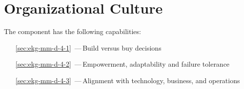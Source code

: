 \chapter{Organizational Culture}\label{ch:ekg-mm-d-4}

The  component has the following capabilities:

\begin{itemize}[leftmargin=.5in]
  \item [\ref{sec:ekg-mm-d-4-1}] \,---\,Build versus buy decisions
  \item [\ref{sec:ekg-mm-d-4-2}] \,---\,Empowerment, adaptability and failure tolerance
  \item [\ref{sec:ekg-mm-d-4-3}] \,---\,Alignment with technology, business, and operations
\end{itemize}





